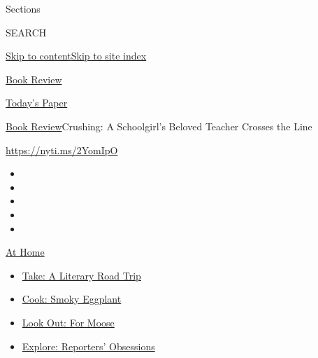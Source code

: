 Sections

SEARCH

\protect\hyperlink{site-content}{Skip to
content}\protect\hyperlink{site-index}{Skip to site index}

\href{https://www.nytimes3xbfgragh.onion/section/books/review}{Book
Review}

\href{https://myaccount.nytimes3xbfgragh.onion/auth/login?response_type=cookie\&client_id=vi}{}

\href{https://www.nytimes3xbfgragh.onion/section/todayspaper}{Today's
Paper}

\href{/section/books/review}{Book Review}\textbar{}Crushing: A
Schoolgirl's Beloved Teacher Crosses the Line

\url{https://nyti.ms/2YomIpO}

\begin{itemize}
\item
\item
\item
\item
\item
\end{itemize}

\href{https://www.nytimes3xbfgragh.onion/spotlight/at-home?action=click\&pgtype=Article\&state=default\&region=TOP_BANNER\&context=at_home_menu}{At
Home}

\begin{itemize}
\tightlist
\item
  \href{https://www.nytimes3xbfgragh.onion/2020/07/28/books/time-for-a-literary-road-trip.html?action=click\&pgtype=Article\&state=default\&region=TOP_BANNER\&context=at_home_menu}{Take:
  A Literary Road Trip}
\item
  \href{https://www.nytimes3xbfgragh.onion/2020/07/29/magazine/bored-with-your-home-cooking-some-smoky-eggplant-will-fix-that.html?action=click\&pgtype=Article\&state=default\&region=TOP_BANNER\&context=at_home_menu}{Cook:
  Smoky Eggplant}
\item
  \href{https://www.nytimes3xbfgragh.onion/2020/07/27/travel/moose-michigan-isle-royale.html?action=click\&pgtype=Article\&state=default\&region=TOP_BANNER\&context=at_home_menu}{Look
  Out: For Moose}
\item
  \href{https://www.nytimes3xbfgragh.onion/interactive/2020/at-home/even-more-reporters-editors-diaries-lists-recommendations.html?action=click\&pgtype=Article\&state=default\&region=TOP_BANNER\&context=at_home_menu}{Explore:
  Reporters' Obsessions}
\end{itemize}

